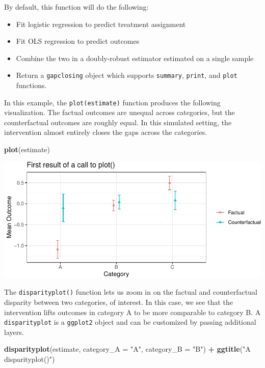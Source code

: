 \documentclass[
]{article}
\newenvironment{Shaded}{\begin{snugshade}}{\end{snugshade}}
\newcommand{\AttributeTok}[1]{\textcolor[rgb]{0.13,0.29,0.53}{#1}}
\newcommand{\FunctionTok}[1]{\textcolor[rgb]{0.13,0.29,0.53}{\textbf{#1}}}
\newcommand{\NormalTok}[1]{#1}
\newcommand{\SpecialCharTok}[1]{\textcolor[rgb]{0.81,0.36,0.00}{\textbf{#1}}}
\newcommand{\StringTok}[1]{\textcolor[rgb]{0.31,0.60,0.02}{#1}}
\providecommand{\tightlist}{%
  \setlength{\itemsep}{0pt}\setlength{\parskip}{0pt}}
\begin{document}
By default, this function will do the following:

\begin{itemize}
\tightlist
\item
  Fit logistic regression to predict treatment assignment
\item
  Fit OLS regression to predict outcomes
\item
  Combine the two in a doubly-robust estimator estimated on a single sample
\item
  Return a \texttt{gapclosing} object which supports \texttt{summary}, \texttt{print}, and \texttt{plot} functions.
\end{itemize}

In this example, the \texttt{plot(estimate)} function produces the following visualization. The factual outcomes are unequal across categories, but the counterfactual outcomes are roughly equal. In this simulated setting, the intervention almost entirely closes the gaps across the categories.

\begin{Shaded}
\begin{Highlighting}[]
\FunctionTok{plot}\NormalTok{(estimate)}
\end{Highlighting}
\end{Shaded}

\includegraphics{github_doc_files/figure-latex/unnamed-chunk-12-1.pdf}

The \texttt{disparityplot()} function lets us zoom in on the factual and counterfactual disparity between two categories, of interest. In this case, we see that the intervention lifts outcomes in category A to be more comparable to category B. A \texttt{disparityplot} is a \texttt{ggplot2} object and can be customized by passing additional layers.

\begin{Shaded}
\begin{Highlighting}[]
\FunctionTok{disparityplot}\NormalTok{(estimate, }\AttributeTok{category\_A =} \StringTok{"A"}\NormalTok{, }\AttributeTok{category\_B =} \StringTok{"B"}\NormalTok{) }\SpecialCharTok{+}
  \FunctionTok{ggtitle}\NormalTok{(}\StringTok{"A disparityplot()"}\NormalTok{)}
\end{Highlighting}
\end{Shaded}
\end{document}
